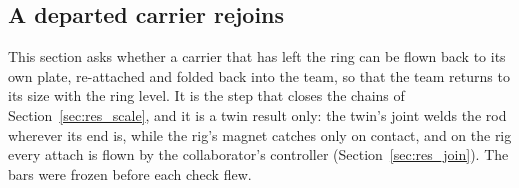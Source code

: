 
\subsection{A departed carrier rejoins}
\label{sec:res_rejoin}

This section asks whether a carrier that has left the ring can be flown back to its own plate, re-attached and folded
back into the team, so that the team returns to its size with the ring level. It is the step that closes the chains of
Section~\ref{sec:res_scale}, and it is a twin result only: the twin's joint welds the rod wherever its end is, while
the rig's magnet catches only on contact, and on the rig every attach is flown by the collaborator's controller
(Section~\ref{sec:res_join}). The bars were frozen before each check flew.

